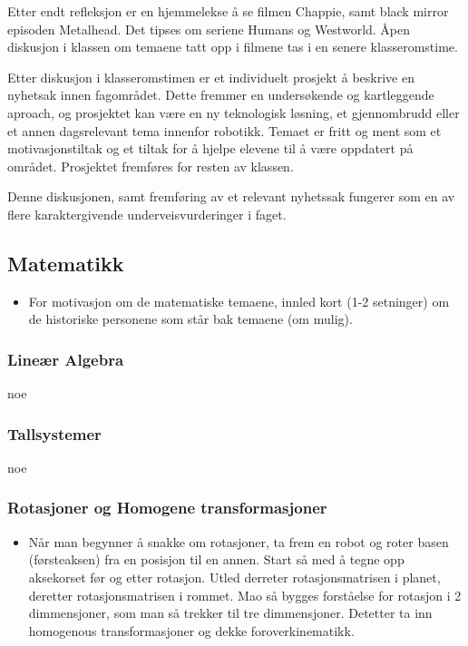 \begin{itemize}
\begin{itemize}
            \end{itemize}
        Etter endt refleksjon er en hjemmelekse å se filmen Chappie, samt black mirror episoden Metalhead. Det tipses om seriene Humans og Westworld. Åpen diskusjon i klassen om temaene tatt opp i filmene tas i en senere klasseromstime.

        Etter diskusjon i klasseromstimen er et individuelt prosjekt å beskrive en nyhetsak innen fagområdet. Dette fremmer en undersøkende og kartleggende aproach, og prosjektet kan være en ny teknologisk løsning, et gjennombrudd eller et annen dagsrelevant tema innenfor robotikk. Temaet er fritt og ment som et motivasjonstiltak og et tiltak for å hjelpe elevene til å være oppdatert på området. Prosjektet fremføres for resten av klassen.

        Denne diskusjonen, samt fremføring av et relevant nyhetssak fungerer som en av flere karaktergivende underveisvurderinger i faget.
    \end{itemize}



\subsection{Matematikk}


    \begin{itemize}
        \item For motivasjon om de matematiske temaene, innled kort (1-2 setninger) om de historiske personene som står bak temaene (om mulig).
    \end{itemize}


    \subsubsection{Lineær Algebra}
        noe


    \subsubsection{Tallsystemer}
        noe


    \subsubsection{Rotasjoner og Homogene transformasjoner}
        \begin{itemize}
            \item Når man begynner å snakke om rotasjoner, ta frem en robot og roter basen (førsteaksen) fra en posisjon til en annen. Start så med å tegne opp aksekorset før og etter rotasjon. Utled derreter rotasjonsmatrisen i planet, deretter rotasjonsmatrisen i rommet. Mao så bygges forståelse for rotasjon i 2 dimmensjoner, som man så trekker til tre dimmensjoner. Detetter ta inn homogenous transformasjoner og dekke foroverkinematikk.
        \end{itemize}


